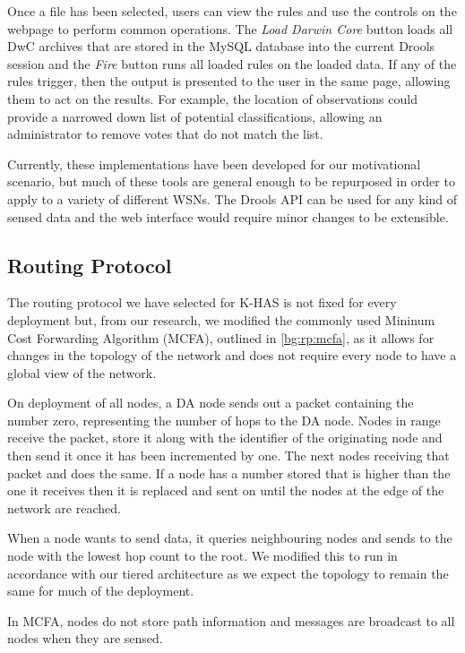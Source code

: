 	Once a file has been selected, users can view the rules and use the controls on the webpage to perform common operations. The \textit{Load Darwin Core} button loads all DwC archives that are stored in the MySQL database into the current Drools session and the \textit{Fire} button runs all loaded rules on the loaded data. If any of the rules trigger, then the output is presented to the user in the same page, allowing them to act on the results. For example, the location of observations could provide a narrowed down list of potential classifications, allowing an administrator to remove votes that do not match the list.
	
	Currently, these implementations have been developed for our motivational scenario, but much of these tools are general enough to be repurposed in order to apply to a variety of different WSNs. The Drools API can be used for any kind of sensed data and the web interface would require minor changes to be extensible.

	\subsection{Routing Protocol}\label{arch:routing}
		The routing protocol we have selected for K-HAS is not fixed for every deployment but, from our research, we modified the commonly used Mininum Cost Forwarding Algorithm (MCFA), outlined in \ref{bg:rp:mcfa}, as it allows for changes in the topology of the network and does not require every node to have a global view of the network.

		On deployment of all nodes, a DA node sends out a packet containing the number zero, representing the number of hops to the DA node. Nodes in range receive the packet, store it along with the identifier of the originating node and then send it once it has been incremented by one. The next nodes receiving that packet and does the same. If a node has a number stored that is higher than the one it receives then it is replaced and sent on until the nodes at the edge of the network are reached.

		When a node wants to send data, it queries neighbouring nodes and sends to the node with the lowest hop count to the root. We modified this to run in accordance with our tiered architecture as we expect the topology to remain the same for much of the deployment.

		In MCFA, nodes do not store path information and messages are broadcast to all nodes when they are sensed.


